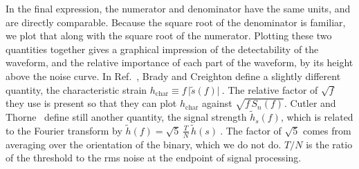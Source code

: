 In the final expression, the numerator and denominator have the same
units, and are directly comparable.  Because the square root of the
denominator is familiar, we plot that along with the square root of
the numerator.  Plotting these two quantities together gives a
graphical impression of the detectability of the waveform, and the
relative importance of each part of the waveform, by its height above
the noise curve.  In Ref.~\cite{BradyCreighton2002}, Brady and
Creighton define a slightly different quantity, the characteristic
strain $h_{\mathrm{char}} \equiv f\, \lvert \tilde{s}(f) \rvert\ .$
The relative factor of $\sqrt{f}$ they use is present so that they can
plot $h_{\mathrm{char}}$ against $\sqrt{f\, S_{n}(f)}$.  Cutler and
Thorne~\cite{Cutler2002} define still another quantity, the signal
strength $\tilde{h}_{s}(f)$, which is related to the Fourier transform
by $\tilde{h}(f) = \sqrt{5}\, \frac{T}{N}\, \tilde{h}(s)\ .$ The
factor of $\sqrt{5}$ comes from averaging over the orientation of the
binary, which we do not do.  $T/N$ is the ratio of the threshold to
the rms noise at the endpoint of signal processing.


